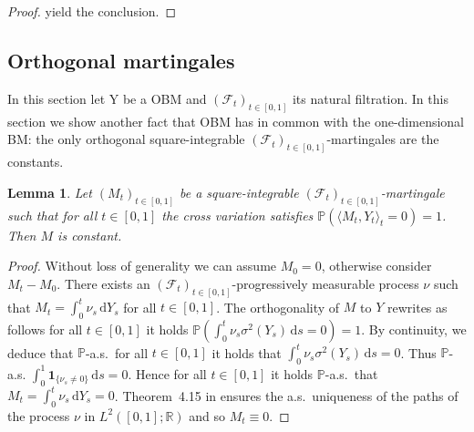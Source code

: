\documentclass[12pt]{article}
\numberwithin{equation}{section}
\newtheorem{lemma}{Lemma}
\theoremstyle{definition}
\theoremstyle{remark}
\newcommand{\RR}{\mathbb{R}}
\newcommand{\PP}{\mathbb{P}}
\newcommand{\EE}{\mathbb{E}}
\newcommand{\cF}{\mathcal{F}}
\newcommand{\ind}[1]{\mathbf{1}_{#1}}
\newcommand{\vd}{\,\mathrm{d}}
\begin{document}
\begin{proof}
yield the conclusion.
\end{proof}




\subsection{Orthogonal martingales} \label{sec:orthogonal}

In this section let Y be a OBM and $(\cF_t)_{t\in [0,1]}$ its natural filtration.
In this section we show another fact that OBM has in common with the one-dimensional BM: the only orthogonal square-integrable $(\cF_t)_{t\in [0,1]}$-martingales are the constants.

\begin{lemma}\label{lem:trivial:OBM}
Let $(M_t)_{t\in [0,1]}$ be a square-integrable $(\cF_t)_{t\in [0,1]}$-martingale such that for all $t\in [0,1]$ the cross variation satisfies $\PP(\langle M_t, Y_t\rangle_t = 0)=1$. Then $M$ is constant.
\end{lemma}
\begin{proof}
Without loss of generality we can assume $M_0=0$, otherwise consider $M_t-M_0$.
There exists an $(\mathcal{F}_t)_{t\in [0,1]}$-progressively measurable process $\nu$ such that $M_t = \int_0^t \nu_s \vd Y_s$ for all $t\in [0,1]$.
The orthogonality of $M$ to $Y$ rewrites as follows for all $t\in [0,1]$ it holds $\PP(\int_0^t \nu_s \sigma^2(Y_s) \vd s = 0)=1$. 
By continuity, we deduce that $\PP$-a.s.~for all $t\in[0,1]$ it holds that $\int_0^t \nu_s \sigma^2(Y_s) \vd s = 0$. 
Thus $\PP$-a.s. $\int_0^1 \ind{\{\nu_s \neq 0\}} \vd s =0$. Hence for all $t\in [0,1]$ it holds $\PP$-a.s.~that $M_t = \int_0^t \nu_s  \vd Y_s = 0$.
 Theorem~4.15 in \cite{ks} ensures the a.s.~uniqueness of the paths of the process $\nu$ in $L^2([0,1];\RR)$ and so $M_t \equiv 0$.
\end{proof}
\end{document}
